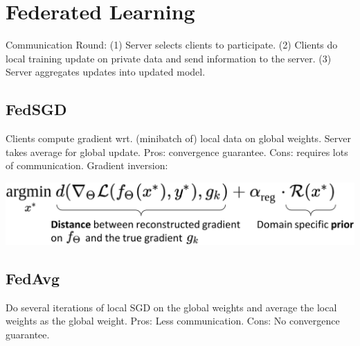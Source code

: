 \section{Federated Learning}
Communication Round: (1) Server selects clients to participate. (2) Clients do local training update on private data and send information to the server. (3) Server aggregates updates into updated model.

\subsection*{FedSGD}
Clients compute gradient wrt. (minibatch of) local data on global weights. Server takes average for global update. Pros: convergence guarantee. Cons: requires lots of communication. Gradient inversion:
\begin{center}
    \includegraphics[width=0.7\linewidth]{img/gradient_inversion.png}
\end{center}

\subsection*{FedAvg} Do several iterations of local SGD on the global weights and average the local weights as the global weight. Pros: Less communication. Cons: No convergence guarantee.

